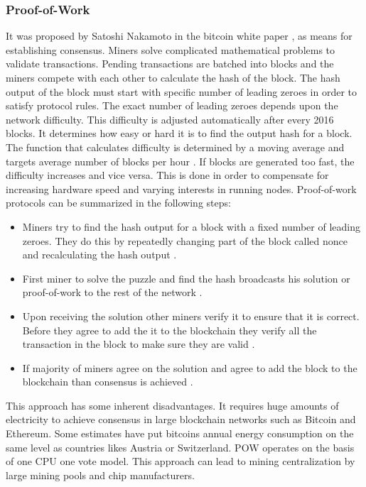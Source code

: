 \subsubsection{Proof-of-Work} \label{PW}
It was proposed by Satoshi Nakamoto in the bitcoin white paper \cite{paper:001}, as means for establishing consensus. Miners solve complicated mathematical problems to validate transactions. Pending transactions are batched into blocks and the miners compete with each other to calculate the hash of the block. The hash output of the block must start with specific number of leading zeroes in order to satisfy protocol rules. The exact number of leading zeroes depends upon the network difficulty. This difficulty is adjusted automatically after every 2016 blocks. It determines how easy or hard it is to find the output hash for a block. The function that calculates difficulty is determined by a moving average and targets average number of blocks per hour \cite{paper:001}. If blocks are generated too fast, the difficulty increases and vice versa. This is done in order to compensate for increasing hardware speed and varying interests in running nodes. Proof-of-work protocols can be summarized in the following steps:

\begin{itemize}
  \item Miners try to find the hash output for a block with a fixed number of leading zeroes. They do this by repeatedly changing part of the block called nonce and recalculating the hash output  \cite{medium:001}.
  \item First miner to solve the puzzle and find the hash broadcasts his solution or proof-of-work to the rest of the network  \cite{medium:001}.
  \item Upon receiving the solution other miners verify it to ensure that it is correct. Before they agree to add the it to the blockchain they verify all the transaction in the block to make sure they are valid  \cite{medium:001}.
  \item If majority of miners agree on the solution and agree to add the block to the blockchain than consensus is achieved  \cite{medium:001}.
\end{itemize}
This approach has some inherent disadvantages. It requires huge amounts of electricity to achieve consensus in large blockchain networks such as Bitcoin and Ethereum. Some estimates have put bitcoins annual energy consumption on the same level as countries likes Austria or Switzerland. POW operates on the basis of one CPU one vote model. This approach can lead to mining centralization by large mining pools and chip manufacturers.
\vspace{0.5cm}  
